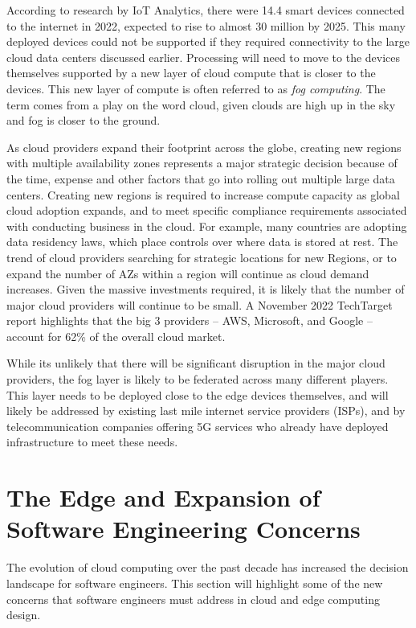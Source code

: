 \documentclass[conference]{IEEEtran}
\begin{document}
According to research by IoT Analytics, there were 14.4 smart devices connected to the internet in 2022, expected to rise to almost 30 million by 2025\cite{IoTMarket}.  This many deployed devices could not be supported if they required connectivity to the large cloud data centers discussed earlier. Processing will need to move to the devices themselves supported by a new layer of cloud compute that is closer to the devices.  This new layer of compute is often referred to as \textit{fog computing}.  The term comes from a play on the word cloud, given clouds are high up in the sky and fog is closer to the ground.   

As cloud providers expand their footprint across the globe, creating new regions with multiple availability zones represents a major strategic decision because of the time, expense and other factors that go into rolling out multiple large data centers. Creating new regions is required to increase compute capacity as global cloud adoption expands, and to meet specific compliance requirements associated with conducting business in the cloud. For example, many countries are adopting data residency laws, which place controls over where data is stored at rest. The trend of cloud providers searching for strategic locations for new Regions, or to expand the number of AZs within a region will continue as cloud demand increases. Given the massive investments required, it is likely that the number of major cloud providers will continue to be small.  A November 2022 TechTarget report\cite{CloudMarketShare} highlights that the big 3 providers -- AWS, Microsoft, and Google -- account for 62\% of the overall cloud market. 

While its unlikely that there will be significant disruption in the major cloud providers, the fog layer is likely to be federated across many different players.  This layer needs to be deployed close to the edge devices themselves, and will likely be addressed by existing last mile internet service providers (ISPs), and by telecommunication companies offering 5G services who already have deployed infrastructure to meet these needs.  


\section{The Edge and Expansion of Software Engineering Concerns}
\label{sec:Polyglot}
The evolution of cloud computing over the past decade has increased the decision landscape for software engineers. This section will highlight some of the new concerns that software engineers must address in cloud and edge computing design.
\end{document}
